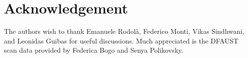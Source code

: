 \documentclass[10pt,twocolumn,letterpaper]{article}
\begin{document}

%

%
%
%



%
%
%

%


\section*{Acknowledgement}
The authors wish to thank Emanuele Rodol\`{a}, Federico Monti, Vikas Sindhwani, and Leonidas Guibas for useful discussions. Much appreciated is the DFAUST scan data provided by Federica Bogo and Senya Polikovsky.

\clearpage

{\small


}


% 
\end{document}
